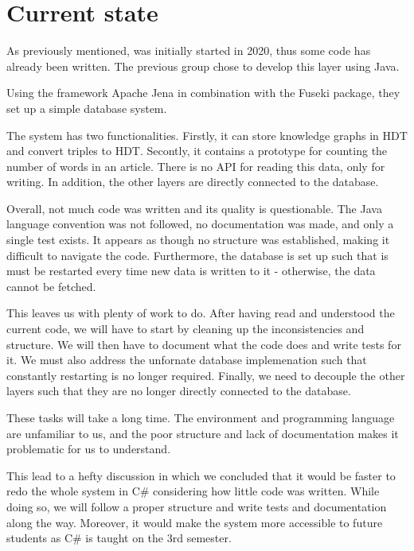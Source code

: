 \section{Current state}

As previously mentioned, \knox{} was initially started in 2020, thus some code has already been written.
The previous group chose to develop this layer using Java.

Using the framework Apache Jena in combination with the Fuseki package, they set up a simple database system.

The system has two functionalities. 
Firstly, it can store knowledge graphs in HDT and convert triples to HDT.
Secontly, it contains a prototype for counting the number of words in an article.
There is no API for reading this data, only for writing. 
In addition, the other layers are directly connected to the database.

Overall, not much code was written and its quality is questionable. 
The Java language convention was not followed, no documentation was made, and only a single test exists. 
It appears as though no structure was established, making it difficult to navigate the code. 
Furthermore, the database is set up such that is must be restarted every time new data is written to it - otherwise, the data cannot be fetched.

This leaves us with plenty of work to do.
After having read and understood the current code, we will have to start by cleaning up the inconsistencies and structure.
We will then have to document what the code does and write tests for it.
We must also address the unfornate database implemenation such that constantly restarting is no longer required.
Finally, we need to decouple the other layers such that they are no longer directly connected to the database.

These tasks will take a long time.
The environment and programming language are unfamiliar to us, and the poor structure and lack of documentation makes it problematic for us to understand.

This lead to a hefty discussion in which we concluded that it would be faster to redo the whole system in C# considering how little code was written. 
While doing so, we will follow a proper structure and write tests and documentation along the way. 
Moreover, it would make the system more accessible to future students as C# is taught on the 3rd semester.  
